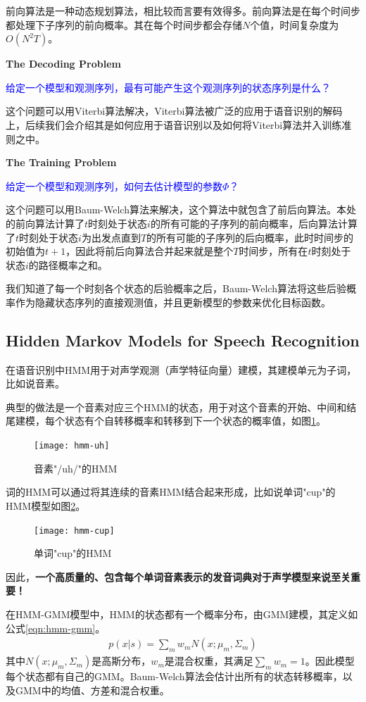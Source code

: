 前向算法是一种动态规划算法，相比较而言要有效得多。前向算法是在每个时间步都处理下子序列的前向概率。其在每个时间步都会存储$N$个值，时间复杂度为$O(N^{2}T)$。

{\bf The Decoding Problem}

\textcolor{blue}{给定一个模型和观测序列，最有可能产生这个观测序列的状态序列是什么？}

这个问题可以用Viterbi算法解决，Viterbi算法被广泛的应用于语音识别的解码上，后续我们会介绍其是如何应用于语音识别以及如何将Viterbi算法并入训练准则之中。

{\bf The Training Problem}

\textcolor{blue}{给定一个模型和观测序列，如何去估计模型的参数$\Phi$？}

这个问题可以用Baum-Welch算法来解决，这个算法中就包含了前后向算法。本处的前向算法计算了$t$时刻处于状态$i$的所有可能的子序列的前向概率，后向算法计算了$t$时刻处于状态$i$为出发点直到$T$的所有可能的子序列的后向概率，此时时间步的初始值为$t+1$，因此将前后向算法合并起来就是整个$T$时间步，所有在$t$时刻处于状态$i$的路径概率之和。

我们知道了每一个时刻各个状态的后验概率之后，Baum-Welch算法将这些后验概率作为隐藏状态序列的直接观测值，并且更新模型的参数来优化目标函数。

\subsection{Hidden Markov Models for Speech Recognition} 
在语音识别中HMM用于对声学观测（声学特征向量）建模，其建模单元为子词，比如说音素。

典型的做法是一个音素对应三个HMM的状态，用于对这个音素的开始、中间和结尾建模，每个状态有个自转移概率和转移到下一个状态的概率值，如图\ref{fig:hmm-uh}。
\begin{figure}[htbp]
  \centering
  \texttt{[image: hmm-uh]}
  \caption{音素"/uh/"的HMM\label{fig:hmm-uh}}
\end{figure}

词的HMM可以通过将其连续的音素HMM结合起来形成，比如说单词"cup"的HMM模型如图\ref{fig:hmm-cup}。
\begin{figure}[htbp]
  \centering
  \texttt{[image: hmm-cup]}
  \caption{单词"cup"的HMM\label{fig:hmm-cup}}
\end{figure}

因此，{\bf 一个高质量的、包含每个单词音素表示的发音词典对于声学模型来说至关重要！}

在HMM-GMM模型中，HMM的状态都有一个概率分布，由GMM建模，其定义如公式\ref{eqn:hmm-gmm}。
\begin{align}
\label{eqn:hmm-gmm}
p(x|s) = \sum_{m} w_m N(x;\mu_{m}, \Sigma_{m})
\end{align}
其中$N(x;\mu_{m}, \Sigma_{m})$是高斯分布，$w_m$是混合权重，其满足$\sum_{m}w_{m}=1$。因此模型每个状态都有自己的GMM。Baum-Welch算法会估计出所有的状态转移概率，以及GMM中的均值、方差和混合权重。

